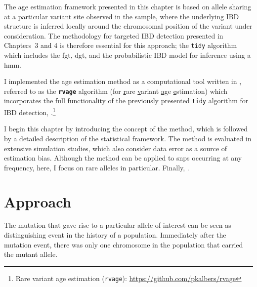 The age estimation framework presented in this chapter is based on allele sharing at a particular variant site observed in the sample, where the underlying IBD structure is inferred locally around the chromosomal position of the variant under consideration.
The methodology for targeted IBD detection presented in Chapters~3 and 4 is therefore essential for this approach; \ie the \texttt{tidy} algorithm which includes the \gls{fgt}, \gls{dgt}, and the probabilistic IBD model for inference using a \gls{hmm}.

I implemented the age estimation method as a computational tool written in \cpp, referred to as the \textbf{\texttt{rvage}} algorithm (for \underline{r}are \underline{v}ariant \underline{a}\underline{g}e \underline{e}stimation) which incorporates the full functionality of the previously presented \texttt{tidy} algorithm for IBD detection, .\footnote{Rare variant age estimation (\texttt{rvage}): \url{https://github.com/pkalbers/rvage}}

I begin this chapter by introducing the concept of the method, which is followed by a detailed description of the statistical framework.
The method is evaluated in extensive simulation studies, which also consider data error as a source of estimation bias.
Although the method can be applied to \glspl{snp} occurring at any frequency, here, I focus on rare alleles in particular.
Finally, .



%
\section{Approach}
%

The mutation that gave rise to a particular allele of interest can be seen as distinguishing event in the history of a population.
Immediately after the mutation event, there was only one chromosome in the population that carried the mutant allele.

